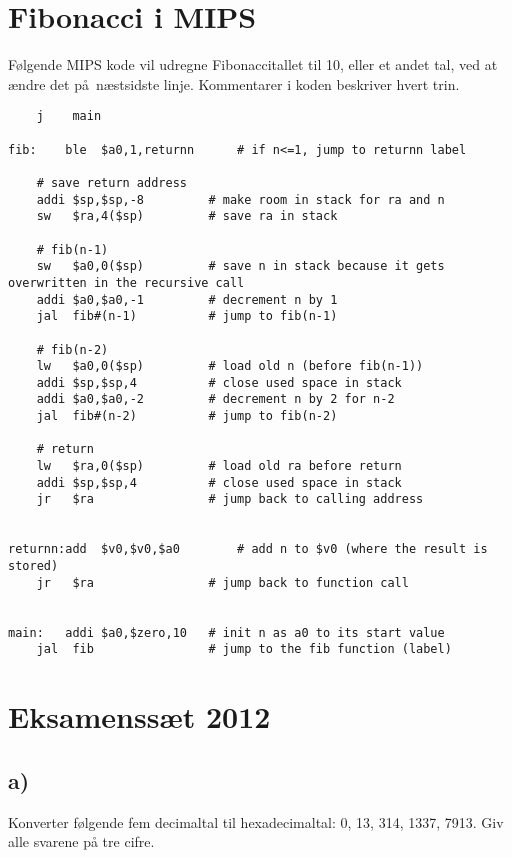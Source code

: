 \documentclass[a4paper,11pt]{article}
\date{\Large{19. marts 2013}}
\author{\huge{\Navn}\\\Skole\\Klasse \Klasse\\\Fag\\\\Vejleder: \Vejleder}
\title{\Huge{\Titel}}
\begin{document}
\frenchspacing

\newpage
\section*{Fibonacci i MIPS}
Følgende MIPS kode vil udregne Fibonaccitallet til 10, eller et andet tal, ved at ændre det på næstsidste linje. Kommentarer i koden beskriver hvert trin.
\begin{verbatim}
    j    main

fib:    ble  $a0,1,returnn      # if n<=1, jump to returnn label

    # save return address
    addi $sp,$sp,-8         # make room in stack for ra and n
    sw   $ra,4($sp)         # save ra in stack

    # fib(n-1)
    sw   $a0,0($sp)         # save n in stack because it gets overwritten in the recursive call
    addi $a0,$a0,-1         # decrement n by 1
    jal  fib#(n-1)          # jump to fib(n-1)

    # fib(n-2)
    lw   $a0,0($sp)         # load old n (before fib(n-1))
    addi $sp,$sp,4          # close used space in stack
    addi $a0,$a0,-2         # decrement n by 2 for n-2
    jal  fib#(n-2)          # jump to fib(n-2)

    # return
    lw   $ra,0($sp)         # load old ra before return
    addi $sp,$sp,4          # close used space in stack
    jr   $ra                # jump back to calling address


returnn:add  $v0,$v0,$a0        # add n to $v0 (where the result is stored)
    jr   $ra                # jump back to function call


main:   addi $a0,$zero,10   # init n as a0 to its start value
    jal  fib                # jump to the fib function (label)
\end{verbatim}

\section*{Eksamenssæt 2012}
\subsection*{a)}

Konverter følgende fem decimaltal til hexadecimaltal: 0, 13, 314, 1337, 7913. Giv alle svarene på tre cifre.
\end{document}
